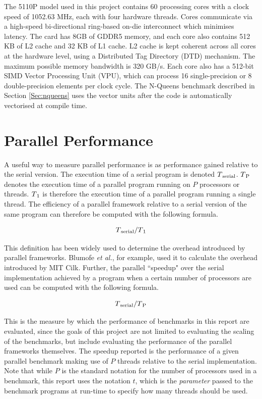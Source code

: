 \documentclass{report}
\begin{document}
The 5110P model used in this project contains 60 processing cores with a clock speed of 1052.63 MHz, each with four hardware threads. Cores communicate via a high-speed bi-directional ring-based on-die interconnect which minimises latency\cite{Jeffers13}. The card has 8GB of GDDR5 memory, and each core also contains 512 KB of L2 cache and 32 KB of L1 cache. L2 cache is kept coherent across all cores at the hardware level, using a Distributed Tag Directory (DTD) mechanism\cite{Jeffers13}. The maximum possible memory bandwidth is 320 GB/s\cite{intel5110p}. Each core also has a 512-bit SIMD Vector Processing Unit (VPU), which can process 16 single-precision or 8 double-precision elements per clock cycle\cite{Tousimojarad14}. The N-Queens benchmark described in Section \ref{Sec:nqueens} uses the vector units after the code is automatically vectorised at compile time.

\section{Parallel Performance} \label{Sec:parallelperformance}
A useful way to measure parallel performance is as performance gained relative to the serial version\cite{Blumofe95}. The execution time of a serial program is denoted \(T\textsubscript{serial}\). \(T\textsubscript{P}\) denotes the execution time of a parallel program running on \(P\) processors or threads. \(T\textsubscript{1}\) is therefore the execution time of a parallel program running a single thread. The efficiency of a parallel framework relative to a serial version of the same program can therefore be computed with the following formula\cite{Blumofe95}.

\begin{equation}
T\textsubscript{serial} / T\textsubscript{1}
\end{equation}

This definition has been widely used to determine the overhead introduced by parallel frameworks. Blumofe \textit{et al.}\cite{Blumofe95}, for example, used it to calculate the overhead introduced by MIT Cilk. Further, the parallel ``speedup" over the serial implementation achieved by a program when a certain number of processors are used can be computed with the following formula.

\begin{equation}
T\textsubscript{serial} / T\textsubscript{P}
\end{equation}

This is the measure by which the performance of benchmarks in this report are evaluated, since the goals of this project are not limited to evaluating the scaling of the benchmarks, but include evaluating the performance of the parallel frameworks themselves. The speedup reported is the performance of a given parallel benchmark making use of \(P\) threads relative to the serial implementation. Note that while \(P\) is the standard notation for the number of processors used in a benchmark, this report uses the notation \(t\), which is the \textit{parameter} passed to the benchmark programs at run-time to specify how many threads should be used.
\end{document}
